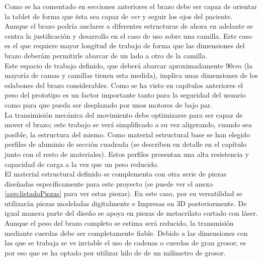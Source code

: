     Como se ha comentado en secciones anteriores el brazo debe ser capaz de orientar la tablet de forma que ésta sea capaz de \textit{ver} y seguir los ojos del paciente. Aunque el brazo podría anclarse a diferentes estructuras de ahora en adelante se centra la justificación y desarrollo en el caso de uso sobre una camilla. Este caso es el que requiere mayor longitud de trabajo de forma que las dimensiones del brazo deberám permitirle abarcar de un lado a otro de la camilla.
    \\

    Este espacio de trabajo definido, que deberá abarcar aproximadamente $90cm$ (la mayoría de camas y camillas tienen esta medida), implica unas dimensiones de los eslabones del brazo considerables. Como se ha visto en capítulos anteriores el peso del prototipo es un factor importante tanto para la seguridad del usuario como para que pueda ser desplazado por unos motores de bajo par.
    \\

    La transimisión mecánica del movimiento debe optimizarse para ser capaz de mover el brazo; este trabajo se verá simplificado a su vez aligerando, cuando sea posible, la estructura del mismo. Como material estructural base se han elegido perfiles de aluminio de sección cuadrada (se describen en detalle en el capítulo \completar junto con el resto de materiales). Estos perfiles presentan una alta resistencia y capacidad de carga a la vez que un peso reducido.
    \\

    El material estructural definido se complementa con otra serie de piezas diseñadas específicamente para este proyecto (se puede ver el anexo \ref{app:listadoPiezas} para ver estas piezas). En este caso, por su versatilidad se utilizarán piezas modeladas digitalmente e Impresas en 3D posteriormente. De igual manera parte del diseño se apoya en piezas de metacrilato cortado con láser.
    \\

    Aunque el peso del brazo completo se estima será reducido, la transmisión mediante cuerdas debe ser completamente fiable. Debido a las dimensiones con las que se trabaja se ve inviable el uso de cadenas o cuerdas de gran grosor; es por eso que se ha optado por utilizar hilo de  de un milímetro de grosor.
    \\

